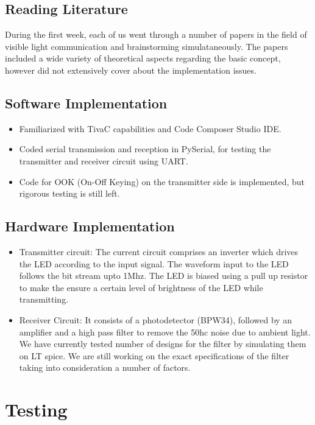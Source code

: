 \documentclass{article}
\begin{document}
\subsection{Reading Literature}

During the first week, each of us went through a number of papers in the field of visible light communication and brainstorming simulataneously. The papers included a wide variety of theoretical aspects regarding the basic concept, however did not extensively cover about the implementation issues. 

\subsection{Software Implementation}
\begin{itemize}
\item Familiarized with TivaC capabilities and Code Composer Studio IDE.
\item Coded serial transmission and reception in PySerial, for testing the transmitter and receiver circuit using UART.
\item Code for OOK (On-Off Keying) on the transmitter side is implemented, but rigorous testing is still left.
\end{itemize}

\subsection{Hardware Implementation}
\begin{itemize}
\item Transmitter circuit: The current circuit comprises an inverter which drives the LED according to the input signal. The waveform input to the LED follows the bit stream upto 1Mhz. The LED is biased using a pull up resistor to make the ensure a certain level of brightness of the LED while transmitting. \\
\item Receiver Circuit: It consists of a photodetector (BPW34), followed by an amplifier and a high pass filter to remove the 50hc noise due to ambient light. We have currently tested number of designs for the filter by simulating them on LT spice. We are still working on the exact specifications of the filter taking into consideration a number of factors.%
\end{itemize}

\section{Testing}
\end{document}
